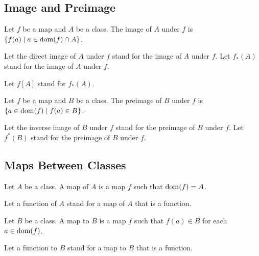 \documentclass[10pt]{article}
\begin{document}
  \subsection*{Image and Preimage}

  \begin{forthel}
    \begin{definition}[id=FOUNDATIONS_06_3038237683613696,printid]
      Let $f$ be a map and $A$ be a class.
      The image of $A$ under $f$ is $\{ f(a) \mid a \in \operatorname{dom}(f) \cap A \}$.
    \end{definition}

    Let the direct image of $A$ under $f$ stand for the image of $A$ under $f$.
    Let $f_{*}(A)$ stand for the image of $A$ under $f$.

    Let $f[A]$ stand for $f_{*}(A)$.
  \end{forthel}

  \begin{forthel}
    \begin{definition}[id=FOUNDATIONS_06_4563167805964288,printid]
      Let $f$ be a map and $B$ be a class.
      The preimage of $B$ under $f$ is $\{ a \in \operatorname{dom}(f) \mid f(a) \in B \}$.
    \end{definition}

    Let the inverse image of $B$ under $f$ stand for the preimage of $B$ under $f$.
    Let $f^{*}(B)$ stand for the preimage of $B$ under $f$.
  \end{forthel}


  \subsection*{Maps Between Classes}

  \begin{forthel}
    \begin{definition}[id=FOUNDATIONS_06_6934038600220672,printid]
      Let $A$ be a class.
      A map of $A$ is a map $f$ such that $\operatorname{dom}(f) = A$.
    \end{definition}

    Let a function of $A$ stand for a map of $A$ that is a function.
  \end{forthel}

  \begin{forthel}
    \begin{definition}[id=FOUNDATIONS_06_7725375157174272,printid]
      Let $B$ be a class.
      A map to $B$ is a map $f$ such that $f(a) \in B$ for each $a \in \operatorname{dom}(f)$.
    \end{definition}

    Let a function to $B$ stand for a map to $B$ that is a function.
  \end{forthel}
\end{document}
